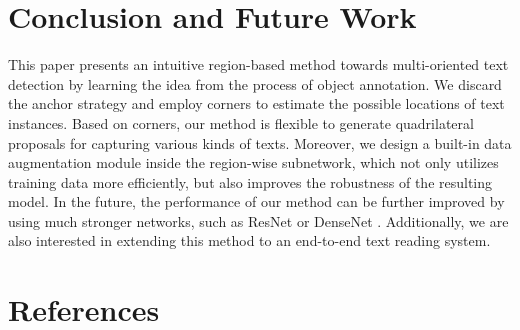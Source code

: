 \documentclass[3p, times]{elsarticle}
\begin{document}
\section{Conclusion and Future Work}
This paper presents an intuitive region-based method towards multi-oriented text detection by learning the idea from the process of object annotation. We discard the anchor strategy and employ corners to estimate the possible locations of text instances. Based on corners, our method is flexible to generate quadrilateral proposals for capturing various kinds of texts. Moreover, we design a built-in data augmentation module inside the region-wise subnetwork, which not only utilizes training data more efficiently, but also improves the robustness of the resulting model. In the future, the performance of our method can be further improved by using much stronger networks, such as ResNet \cite{RESNET2016CVPR} or DenseNet \cite{DENSENET2017CVPR}. Additionally, we are also interested in extending this method to an end-to-end text reading system. 





\section*{References}


\end{document}
